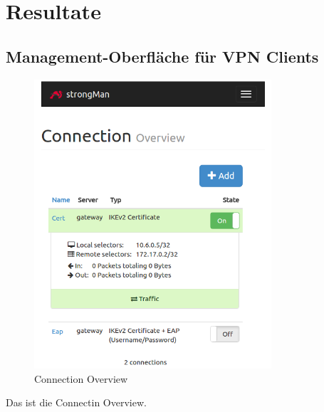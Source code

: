\newpage
\section{Resultate}
\subsection{Management-Oberfläche für VPN Clients}
\noindent\begin{minipage}[t]{0.6\textwidth}
\vspace{0pt}
    \begin{figure}[H]
    	\centering
    	\includegraphics[width=250pt]{images/con_overview.png}
    	\caption{Connection Overview}
    \end{figure}
\end{minipage}
\hfill
\begin{minipage}[t]{0.4\textwidth}
\vspace{0pt}
Das ist die Connectin Overview.
\end{minipage}

\newpage

